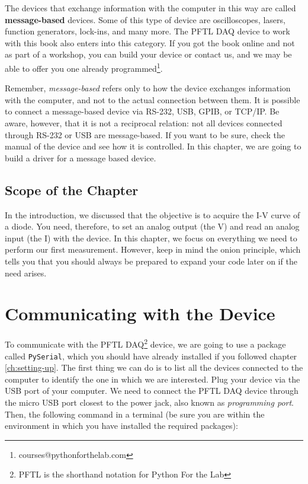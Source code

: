 The devices that exchange information with the computer in this way are called \textbf{message-based} devices. Some of this type of device are oscilloscopes, lasers, function generators, lock-ins, and many more. The {PFTL DAQ} device to work with this book also enters into this category. If you got the book online and not as part of a workshop, you can build your device or contact us, and we may be able to offer you one already programmed\footnote{courses@pythonforthelab.com}.


Remember, \textit{message-based} refers only to how the device exchanges information with the computer, and not to the actual connection between them. It is possible to connect a message-based device via RS-232, USB, GPIB, or TCP/IP. Be aware, however, that it is not a reciprocal relation: not all devices connected through RS-232 or USB are message-based. If you want to be sure, check the manual of the device and see how it is controlled. In this chapter, we are going to build a driver for a message based device.

\subsection{Scope of the Chapter}
In the introduction, we discussed that the objective is to acquire the I-V curve of a diode. You need, therefore, to set an analog output (the V) and read an analog input (the I) with the device. In this chapter, we focus
on everything we need to perform our first measurement. However, keep in mind the onion principle, which tells you that you should always be prepared to expand your code later on if the need arises.

\section{Communicating with the Device}\label{message-basedevices}
To communicate with the {PFTL DAQ}\footnote{PFTL is the shorthand notation for Python For the Lab} device, we are going to use a package called \texttt{PySerial}, which you should have already installed if you followed chapter \ref{ch:setting-up}. The first thing we can do is to list all the devices connected to the computer to identify the one in which we are interested. Plug your device via the USB port of your computer. We need to connect the {PFTL DAQ} device through the micro USB port closest to the power jack, also known as \emph{programming port}. Then, the following command in a terminal (be sure you are within the environment in which you have installed the required packages):

